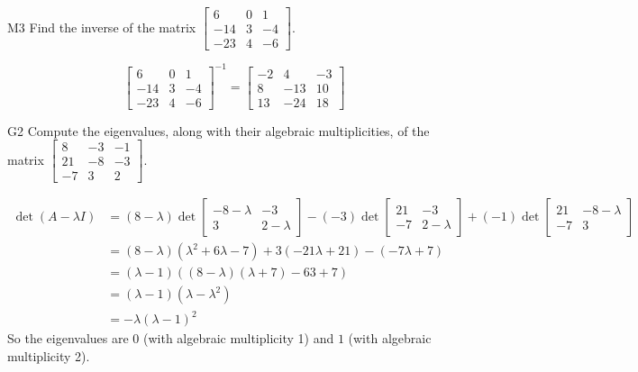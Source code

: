 \documentclass{sbgLAquiz}
\begin{document}
\begin{extract}\newpage\end{extract}
\begin{problem}{M3} Find the inverse of the matrix $\begin{bmatrix} 6 & 0 & 1 \\ -14 & 3 & -4 \\ -23 & 4 & -6\end{bmatrix}$.
\end{problem}
\begin{solution}
$$\begin{bmatrix} 6 & 0 & 1 \\ -14 & 3 & -4 \\ -23 & 4 & -6\end{bmatrix}^{-1} = \begin{bmatrix} -2 & 4 & -3 \\ 8 & -13 & 10 \\ 13 & -24 & 18 \end{bmatrix}$$
\end{solution}

\begin{problem}{G2} 
Compute the eigenvalues, along with their algebraic multiplicities, of the matrix $ \begin{bmatrix} 8 & -3 & -1 \\ 21 & -8 & -3 \\ -7 & 3 & 2\end{bmatrix}$.
\end{problem}
\begin{solution}
\begin{align*}
\det(A-\lambda I) &= (8-\lambda) \det \begin{bmatrix} -8-\lambda & -3 \\ 3 & 2-\lambda \end{bmatrix}-(-3) \det \begin{bmatrix} 21 & -3 \\ -7 & 2-\lambda \end{bmatrix} +(-1) \det \begin{bmatrix} 21 & -8-\lambda \\ -7 & 3 \end{bmatrix} \\
&=(8-\lambda)\left(\lambda ^2+6\lambda-7\right)+3\left(-21\lambda + 21 \right)-\left(-7\lambda +7 \right) \\
&=(\lambda -1) \left( (8-\lambda)(\lambda+7)-63+7 \right) \\
&= (\lambda-1)(\lambda -\lambda ^2) \\
&= -\lambda (\lambda-1)^2
\end{align*}
So the eigenvalues are $0$ (with algebraic multiplicity 1) and $1$ (with algebraic multiplicity 2).
\end{solution}
\end{document}
